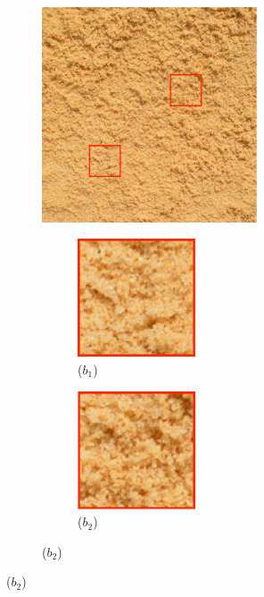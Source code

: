 \begin{figure}
\begin{subfigure}{0.45\textwidth}
	\end{subfigure}
	\hfill
	\begin{subfigure}{0.45\textwidth}
		\centering
		\includegraphics[width=0.7\textwidth]{images/mrf-2}
		\caption*{($b$)}
		
		\begin{subfigure}{0.45\textwidth}
			\centering
			\includegraphics[width=0.5\textwidth]{images/mrf-2-1}
			\caption*{($b_1$)}
		\end{subfigure}
		\hfill
		\begin{subfigure}{0.45\textwidth}
			\centering
			\includegraphics[width=0.5\textwidth]{images/mrf-2-2}
			\caption*{($b_2$)}
		\end{subfigure}
		

\end{subfigure}
\end{figure}
